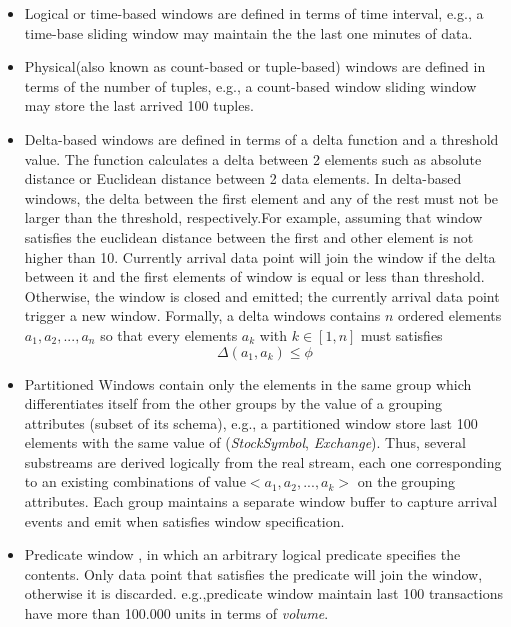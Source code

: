 \begin{itemize}
	\item Logical or time-based windows are defined in terms of time interval, e.g., a time-base sliding window may maintain the the last one minutes of data.
	
	\item Physical(also known as count-based or tuple-based) windows are defined in terms of the number of tuples, e.g., a count-based window sliding window may store the last arrived 100 tuples.
	
	\item Delta-based windows are defined in terms of a delta function and a threshold value. The function calculates a delta between 2 elements such as absolute distance or Euclidean distance between 2 data elements. In delta-based windows, the delta between the first element and any of the rest must not be larger than the threshold, respectively.For example, assuming that window satisfies the euclidean distance between the first and other element is not higher than 10. Currently arrival data point will join the window if the delta between it and the first elements of window is equal or less than threshold. Otherwise, the window is closed and emitted; the currently arrival data point trigger a new window. Formally, a delta windows contains $n$ ordered elements $a_1, a_2,...,a_n$ so that every elements $a_k$ with $k \in [1,n]$ must satisfies
	\begin{equation}
		\Delta(a_1,a_k) \leq \phi
	\end{equation}

	\item Partitioned Windows contain only the elements  in the same group which differentiates itself from the other groups  by the value of a grouping attributes (subset of its schema), e.g., a partitioned window store last 100 elements with the same value of (\textit{StockSymbol}, \textit{Exchange}). Thus, several  substreams are derived logically from the real stream, each one corresponding to an existing combinations of value$<a_1,a_2,...,a_k>$ on the grouping attributes. Each group maintains a separate window buffer to capture arrival events and emit when satisfies window specification.
	
	
	\item Predicate window \citep{Ghanem:2008} , in which an arbitrary logical predicate specifies the contents. Only data point that satisfies the predicate will join the window, otherwise it is discarded. e.g.,predicate window maintain last 100 transactions have more than 100.000 units in terms of \textit{volume}.
	
\end{itemize}

